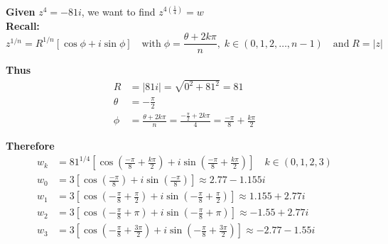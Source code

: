 \documentclass[a4paper, 8pt]{extarticle}
\begin{document}
\begin{examplebox}[: Determine all solutions to $z^4 = -81i$ and find a polynomial $p(z)$ with complex coefficients with root $w$ and $p(\overline{w}) \neq 0$]
    \label{sol:20188Q1b}
    \textbf{Given} $z^4 = -81i$, we want to find $z^{4\left(\frac{1}{4}\right)} = w $ \\
    \textbf{Recall:}
    $$z^{1/n} = R^{1/n}[\cos\phi + i\sin \phi] \quad \text{with} \; \phi = \frac{\theta + 2k\pi}{n}, \; k \in (0,1,2,\dots, n-1) \quad \text{and} \; R = |z|$$
    \begin{minipage}{0.49\textwidth}
        \textbf{Thus}
        \begin{align*}
            R      & = |81i| = \sqrt{0^2 + 81^2} = 81                                                                \\
            \theta & = -\frac{\pi}{2}                                                                                \\
            \phi   & = \frac{\theta + 2k\pi}{n} = \frac{-\frac{\pi}{2} + 2k\pi}{4} = \frac{-\pi}{8} + \frac{k\pi}{2}
        \end{align*}
    \end{minipage}
    \begin{minipage}{0.5\textwidth}
        \begin{center}
        \end{center}
    \end{minipage}

    \textbf{Therefore}
    \begin{align*}
        w_k & = 81^{1/4}\left[\cos\left(\frac{-\pi}{8} + \frac{k\pi}{2}\right) + i\sin\left(\frac{-\pi}{8} + \frac{k\pi}{2}\right)\right] \quad k \in (0,1,2,3) \\
        w_0 & = 3\left[\cos\left(\frac{-\pi}{8}\right) + i\sin\left(\frac{-\pi}{8}\right)\right] \approx 2.77 - 1.155i                                          \\
        w_1 & = 3\left[\cos\left(-\frac{\pi}{8} + \frac{\pi}{2}\right) + i\sin\left(-\frac{\pi}{8} + \frac{\pi}{2}\right)\right] \approx 1.155 + 2.77i          \\
        w_2 & = 3\left[\cos\left(-\frac{\pi}{8} + \pi\right) + i\sin\left(-\frac{\pi}{8} + \pi\right)\right] \approx -1.55 + 2.77i                              \\
        w_3 & = 3\left[\cos\left(-\frac{\pi}{8} + \frac{3\pi}{2}\right) + i\sin\left(-\frac{\pi}{8} + \frac{3\pi}{2}\right)\right] \approx -2.77 - 1.55i
    \end{align*}



\end{examplebox}
\end{document}
